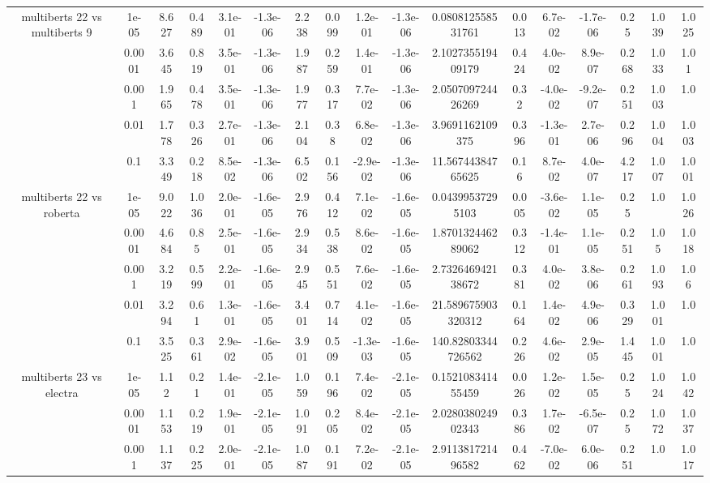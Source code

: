 \begin{tabular}{|c|c|c|c|c|c|c|c|c|c|c|c|c|c|c|c|c|}
\hline
\multirow{5}{*}{multiberts 22 vs multiberts 9} & 1e-05 & 8.627 & 0.489 & 3.1e-01 & -1.3e-06 & 2.238 & 0.099 & 1.2e-01 & -1.3e-06 & 0.080812558531761 & 0.013 & 6.7e-02 & -1.7e-06 & 0.25 & 1.039 & 1.025 \\
 & 0.0001 & 3.645 & 0.819 & 3.5e-01 & -1.3e-06 & 1.987 & 0.259 & 1.4e-01 & -1.3e-06 & 2.102735519409179 & 0.424 & 4.0e-02 & 8.9e-07 & 0.268 & 1.033 & 1.01 \\
 & 0.001 & 1.965 & 0.478 & 3.5e-01 & -1.3e-06 & 1.977 & 0.317 & 7.7e-02 & -1.3e-06 & 2.050709724426269 & 0.32 & -4.0e-02 & -9.2e-07 & 0.251 & 1.003 & 1.0 \\
 & 0.01 & 1.778 & 0.326 & 2.7e-01 & -1.3e-06 & 2.104 & 0.38 & 6.8e-02 & -1.3e-06 & 3.9691162109375 & 0.396 & -1.3e-01 & 2.7e-06 & 0.296 & 1.004 & 1.003 \\
 & 0.1 & 3.349 & 0.218 & 8.5e-02 & -1.3e-06 & 6.502 & 0.156 & -2.9e-02 & -1.3e-06 & 11.56744384765625 & 0.16 & 8.7e-02 & 4.0e-07 & 4.217 & 1.007 & 1.001 \\
\hline
\multirow{5}{*}{multiberts 22 vs roberta } & 1e-05 & 9.022 & 1.036 & 2.0e-01 & -1.6e-05 & 2.976 & 0.412 & 7.1e-02 & -1.6e-05 & 0.04399537295103 & 0.005 & -3.6e-02 & 1.1e-05 & 0.25 & 1.0 & 1.026 \\
 & 0.0001 & 4.684 & 0.85 & 2.5e-01 & -1.6e-05 & 2.934 & 0.538 & 8.6e-02 & -1.6e-05 & 1.870132446289062 & 0.312 & -1.4e-01 & 1.1e-05 & 0.251 & 1.05 & 1.018 \\
 & 0.001 & 3.219 & 0.599 & 2.2e-01 & -1.6e-05 & 2.945 & 0.551 & 7.6e-02 & -1.6e-05 & 2.732646942138672 & 0.381 & 4.0e-02 & 3.8e-06 & 0.261 & 1.093 & 1.06 \\
 & 0.01 & 3.294 & 0.61 & 1.3e-01 & -1.6e-05 & 3.401 & 0.714 & 4.1e-02 & -1.6e-05 & 21.589675903320312 & 0.164 & 1.4e-02 & 4.9e-06 & 0.329 & 1.001 & 1.0 \\
 & 0.1 & 3.525 & 0.361 & 2.9e-02 & -1.6e-05 & 3.901 & 0.509 & -1.3e-03 & -1.6e-05 & 140.82803344726562 & 0.226 & 4.6e-02 & 2.9e-05 & 1.445 & 1.001 & 1.0 \\
\hline
\multirow{5}{*}{multiberts 23 vs electra } & 1e-05 & 1.12 & 0.21 & 1.4e-01 & -2.1e-05 & 1.059 & 0.196 & 7.4e-02 & -2.1e-05 & 0.152108341455459 & 0.026 & 1.2e-02 & 1.5e-05 & 0.25 & 1.024 & 1.042 \\
 & 0.0001 & 1.153 & 0.219 & 1.9e-01 & -2.1e-05 & 1.091 & 0.205 & 8.4e-02 & -2.1e-05 & 2.028038024902343 & 0.386 & 1.7e-02 & -6.5e-07 & 0.25 & 1.072 & 1.037 \\
 & 0.001 & 1.137 & 0.225 & 2.0e-01 & -2.1e-05 & 1.087 & 0.191 & 7.2e-02 & -2.1e-05 & 2.911381721496582 & 0.462 & -7.0e-02 & 6.0e-06 & 0.251 & 1.0 & 1.017 \\

\end{tabular}
